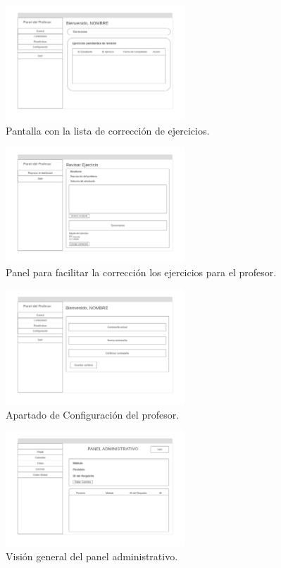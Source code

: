 \begin{figure}[H]
    \centering
    \includegraphics[width=0.6\textwidth]{imagenes/Mockups/13-Profesor-Corregir.png}
    \caption{Pantalla con la lista de corrección de ejercicios.}
\end{figure}

\begin{figure}[H]
    \centering
    \includegraphics[width=0.6\textwidth]{imagenes/Mockups/14-Profesor-Corregir-Ejercicio.png}
    \caption{Panel para facilitar la corrección los ejercicios para el profesor.}
\end{figure}

\begin{figure}[H]
    \centering
    \includegraphics[width=0.6\textwidth]{imagenes/Mockups/15-Profesor-Configuracion.png}
    \caption{Apartado de Configuración del profesor.}
\end{figure}

\begin{figure}[H]
    \centering
    \includegraphics[width=0.6\textwidth]{imagenes/Mockups/16-Panel-Administrativo.png}
    \caption{Visión general del panel administrativo.}
\end{figure}

